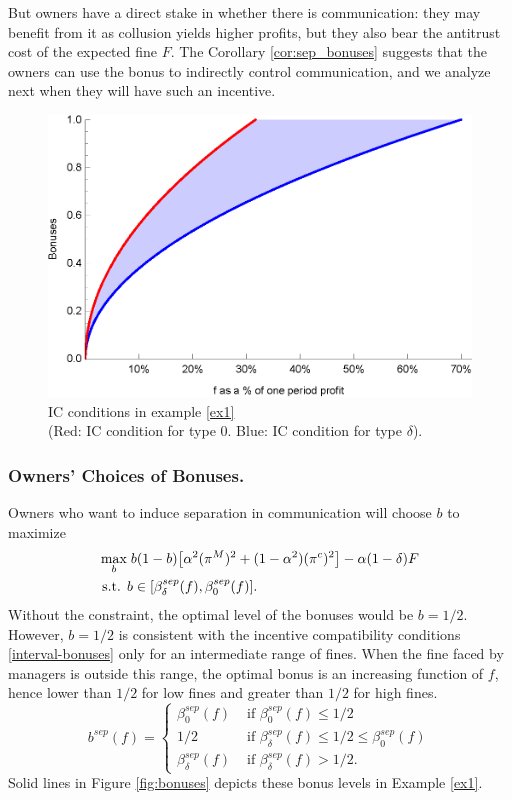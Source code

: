 \documentclass[]{article}
\begin{document}
But owners have a direct stake in whether there is communication: they may benefit from it as collusion yields higher profits, but they also bear the antitrust cost of the expected fine $F$. The Corollary \ref{cor:sep_bonuses} suggests that the owners can use the bonus to indirectly control communication, and we analyze next when they will have such an incentive.
%
\begin{figure}[ht]
\centering
\includegraphics[scale=0.8]{Plots/Bertrand_sep_IC_bonuses.eps}
\caption{IC conditions in example \ref{ex1}\\ (Red: IC condition for type $0$. Blue: IC condition for type $\delta$).}\label{fig:sep_IC_bonuses}
\end{figure}

\subsubsection*{Owners' Choices of Bonuses.} 
Owners who want to induce separation in communication will choose $b$ to maximize
\begin{align}\label{prog:owners}
\max_{b}&\; b (1-b) \big[\alpha^2 (\pi^M)^2 + (1-\alpha^2) (\pi^c)^2\big]- \alpha (1-\delta)F\\
\text{s.t. }&b\in[\beta^{sep}_\delta(f),\beta^{sep}_0(f)].\notag
\end{align}
%
Without the constraint, the optimal level of the bonuses would be $b=1/2$. However, $b=1/2$ is consistent with the incentive compatibility conditions \eqref{interval-bonuses} only for an intermediate range of fines. When the fine faced by managers is outside this range, the optimal bonus is an increasing function of $f$, hence lower than $1/2$ for low fines and greater than $1/2$ for high fines.
\begin{equation}\label{bonuses-sep}
b^{sep}(f) = 
\begin{cases}
\beta^{sep}_0(f) & \text{ if }\beta^{sep}_0(f) \leq 1/2 \\         
1/2 & \text{ if }\beta^{sep}_\delta(f) \leq 1/2 \leq \beta^{sep}_0(f) \\
\beta^{sep}_\delta(f) & \text{ if }\beta^{sep}_\delta(f)>1/2.
\end{cases}
\end{equation}
Solid lines in Figure \ref{fig:bonuses} depicts these bonus levels in Example \ref{ex1}.
\end{document}
